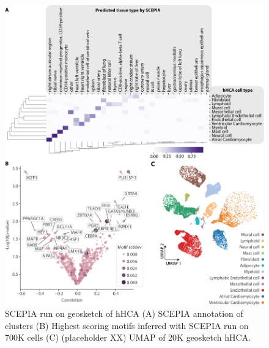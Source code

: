 \begin{figure}
    \centering
    \includegraphics[width=\linewidth]{ch.scepia/imgs/SCEPIAGEOSKETCH_AllCells20000_Myriad_v3_SuppfigGeoAnno.png}
    \caption{SCEPIA run on geosketch of hHCA (A) SCEPIA annotation of clusters (B) Highest scoring motifs inferred with SCEPIA run on 700K cells (C) (placeholder XX) UMAP of 20K geosketch hHCA. }
    \label{fig:geoscepia_results}
\end{figure}


